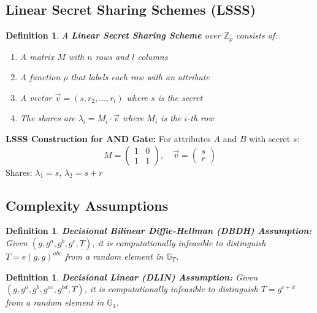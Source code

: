 \documentclass[11pt,a4paper]{article}
\newtheorem{definition}[theorem]{Definition}
\begin{document}
\subsection{Linear Secret Sharing Schemes (LSSS)}

\begin{definition}
A \textbf{Linear Secret Sharing Scheme} over $\mathbb{Z}_p$ consists of:
\begin{enumerate}
    \item A matrix $M$ with $n$ rows and $l$ columns
    \item A function $\rho$ that labels each row with an attribute
    \item A vector $\vec{v} = (s, r_2, \ldots, r_l)$ where $s$ is the secret
    \item The shares are $\lambda_i = M_i \cdot \vec{v}$ where $M_i$ is the $i$-th row
\end{enumerate}
\end{definition}

\begin{mathbox}
\textbf{LSSS Construction for AND Gate:}
For attributes $A$ and $B$ with secret $s$:
\[M = \begin{pmatrix} 1 & 0 \\ 1 & 1 \end{pmatrix}, \quad \vec{v} = \begin{pmatrix} s \\ r \end{pmatrix}\]
Shares: $\lambda_1 = s$, $\lambda_2 = s + r$
\end{mathbox}

\subsection{Complexity Assumptions}

\begin{definition}
\textbf{Decisional Bilinear Diffie-Hellman (DBDH) Assumption:} Given $(g, g^a, g^b, g^c, T)$, it is computationally infeasible to distinguish $T = e(g,g)^{abc}$ from a random element in $\mathbb{G}_T$.
\end{definition}

\begin{definition}
\textbf{Decisional Linear (DLIN) Assumption:} Given $(g, g^a, g^b, g^{ac}, g^{bd}, T)$, it is computationally infeasible to distinguish $T = g^{c+d}$ from a random element in $\mathbb{G}_1$.
\end{definition}
\end{document}
